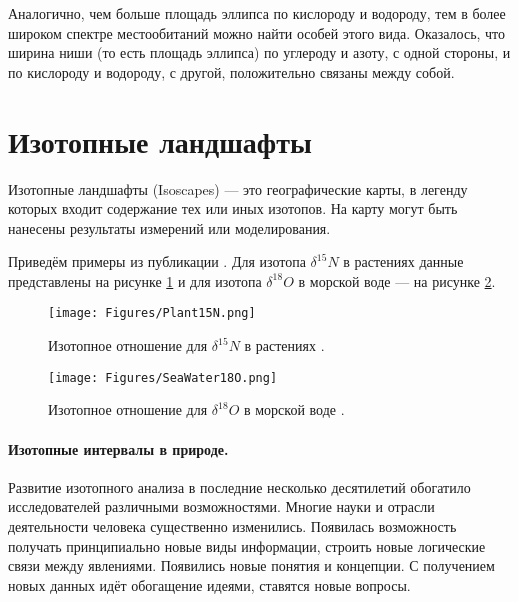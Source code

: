 \documentclass[a5paper,openany]{book}
\begin{document}
Аналогично, чем больше площадь эллипса по кислороду и водороду, тем в более широком спектре местообитаний можно найти особей этого вида. Оказалось, что ширина ниши (то есть площадь эллипса) по углероду и азоту, с одной стороны, и по кислороду и водороду, с другой, положительно связаны между собой.


\section{ Изотопные ландшафты }\label{s:IsoScapes}

Изотопные ландшафты (Isoscapes) --- это географические карты, в легенду которых входит содержание тех или иных изотопов. На карту могут быть нанесены результаты измерений или моделирования. 

Приведём примеры из публикации \cite{Bowen2010}. Для изотопа  $\delta^{15}N$ в растениях данные представлены на рисунке \ref{f:Plant15N} и для изотопа  $\delta^{18}O$ в морской воде --- на рисунке \ref{f:SeaWater18O}.
\begin{figure}[ht] 
	\centering\small
	\unitlength=1mm
	{\texttt{[image: Figures/Plant15N.png]}} 
	\caption{Изотопное отношение для $\delta^{15}N$ в растениях \cite{Bowen2010}.} 
	\label{f:Plant15N}
\end{figure}


\begin{figure}[ht] 
	\centering\small
	\unitlength=1mm
	{\texttt{[image: Figures/SeaWater18O.png]}} 
	\caption{Изотопное отношение для  $\delta^{18}O$ в морской воде \cite{Bowen2010}.} 
	\label{f:SeaWater18O}
\end{figure}

\paragraph{Изотопные интервалы в природе.}

Развитие изотопного анализа в последние несколько десятилетий обогатило исследователей различными возможностями. Многие науки и отрасли деятельности человека существенно изменились. Появилась возможность получать принципиально новые виды информации, строить новые логические связи между явлениями. Появились новые понятия  и концепции. С получением новых данных идёт обогащение идеями, ставятся новые вопросы.
\end{document}
